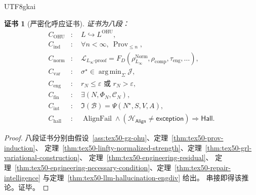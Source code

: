 \documentclass[12pt]{article}
\newtheorem{Certificate}{证书}[section]
\newcommand{\Linfty}{\ensuremath{L_\infty}}
\newcommand{\Prov}{\operatorname{Prov}}
\newcommand{\Norm}{\operatorname{Norm}}
\newcommand{\Hall}{\mathsf{Hall}}
\newcommand{\Align}{\mathsf{Align}}
\DeclareMathOperator*{\argmin}{arg\,min}
\begin{document}
\begin{CJK*}{UTF8}{gkai}
\begin{Certificate}[严密化呼应证书]
证书为八段：
\[
\begin{aligned}
  C_{\mathrm{OHU}}&:\quad L\hookrightarrow L^{\mathrm{OHU}},\\
  C_{\mathrm{ind}}&:\quad \forall n<\infty,\ \Prov_{\le n},\\
  C_{\mathrm{norm}}&:\quad
  \mathcal L_{\Linfty\text{-}\mathrm{proof}}
  =F_D(\rho_{\Linfty}^{\Norm},\rho_{\mathrm{comp}},\tau_{\mathrm{eng}},\dots),\\
  C_{\mathrm{var}}&:\quad \sigma^\star\in\argmin_{\Sigma}\mathcal J,\\
  C_{\mathrm{eng}}&:\quad r_N\le\varepsilon\text{ 或 }r_N>\varepsilon,\\
  C_{\mathrm{fin}}&:\quad \exists(N,\Phi_N,\mathcal C_N),\\
  C_{\mathrm{int}}&:\quad \mathfrak I(\mathcal B)=\Psi(N^\star,S,V,A),\\
  C_{\mathrm{hall}}&:\quad \operatorname{AlignFail}\wedge(\mathcal H_{\Align}\neq\mathsf{exception})
  \Rightarrow\Hall.
\end{aligned}
\]
\end{Certificate}

\begin{proof}
八段证书分别由假设~\ref{ass:tex50-gz-ohu}、定理~\ref{thm:tex50-prov-induction}、
定理~\ref{thm:tex50-linfty-normalized-strength}、定理~\ref{thm:tex50-grl-variational-construction}、
定理~\ref{thm:tex50-engineering-residual}、
定理~\ref{thm:tex50-engineering-necessary-condition}、定理~\ref{thm:tex50-repair-intelligence}
与定理~\ref{thm:tex50-llm-hallucination-engdiv} 给出。
串接即得该推论。证毕。
\end{proof}


\end{CJK*}
\end{document}
